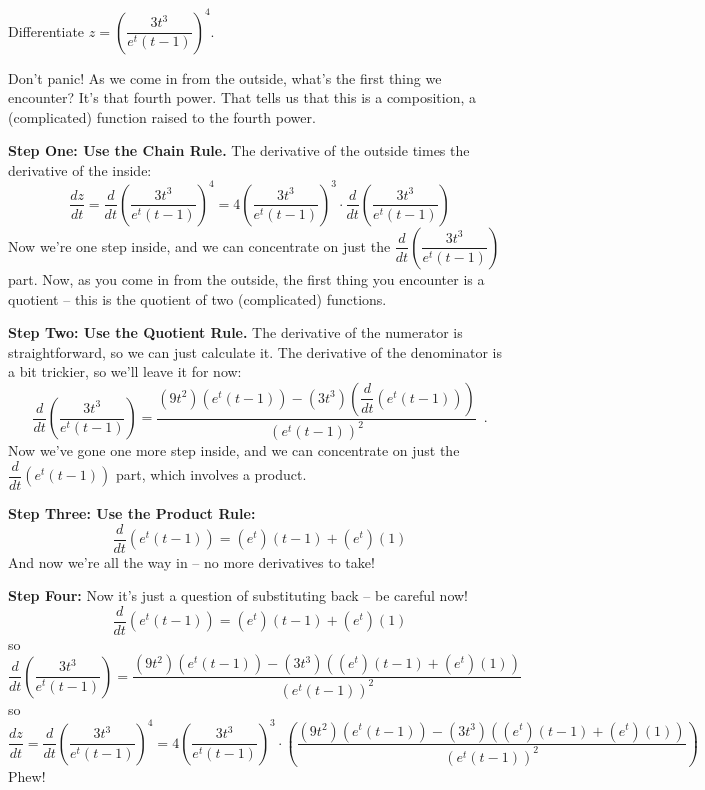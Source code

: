 \begin{example}
Differentiate $ z=\left(\dfrac{3t^3}{e^t(t-1)}\right)^4 $.

\begin{solution} Don't panic! As we come in from the outside, what's the first thing we encounter? It's that fourth power. That tells us that this is a composition, a (complicated) function raised to the fourth power.

{\bf Step One: Use the Chain Rule.} The derivative of the outside times the derivative of the inside:
$$\dfrac{dz}{dt}=\dfrac{d}{dt}\left(\dfrac{3t^3}{e^t(t-1)}\right)^4=4\left(\dfrac{3t^3}{e^t(t-1)}\right)^3\cdot \dfrac{d}{dt}\left(\dfrac{3t^3}{e^t(t-1)}\right)$$
Now we're one step inside, and we can concentrate on just the $ \dfrac{d}{dt}\left(\dfrac{3t^3}{e^t(t-1)}\right) $ part. Now, as you come in from the outside, the first thing you encounter is a quotient -- this is the quotient of two (complicated) functions.

{\bf Step Two: Use the Quotient Rule.} The derivative of the numerator is straightforward, so we can just calculate it. The derivative of the denominator is a bit trickier, so we'll leave it for now:
$$ \dfrac{d}{dt}\left(\dfrac{3t^3}{e^t(t-1)}\right)=\dfrac{\left( 9t^2 \right)\left( e^t(t-1) \right)-\left( 3t^3 \right)\left( \dfrac{d}{dt}\left( e^t(t-1) \right) \right)}{\left(e^t(t-1)\right)^2} \enspace . $$
Now we've gone one more step inside, and we can concentrate on just the $ \dfrac{d}{dt}\left( e^t(t-1) \right) $ part, which involves a product.

{\bf Step Three: Use the Product Rule:}
$$ \dfrac{d}{dt}\left( e^t(t-1)\right) = \left( e^t \right)(t-1)+\left( e^t \right)(1)$$
And now we're all the way in -- no more derivatives to take!

{\bf Step Four:} Now it's just a question of substituting back -- be careful now!
$$ \dfrac{d}{dt}\left( e^t(t-1)\right) = \left( e^t \right)(t-1)+\left( e^t \right)(1) $$ 
so
$$ \dfrac{d}{dt}\left(\dfrac{3t^3}{e^t(t-1)}\right)=\dfrac{\left( 9t^2 \right)\left( e^t(t-1) \right)-\left( 3t^3 \right)\left( \left( e^t \right)(t-1)+\left( e^t \right)(1) \right)}{\left(e^t(t-1)\right)^2} $$ 
so
$$\dfrac{dz}{dt}=\dfrac{d}{dt}\left(\dfrac{3t^3}{e^t(t-1)}\right)^4=4\left(\dfrac{3t^3}{e^t(t-1)}\right)^3\cdot \left( \dfrac{\left( 9t^2 \right)\left( e^t(t-1) \right)-\left( 3t^3 \right)\left( \left( e^t \right)(t-1)+\left( e^t \right)(1) \right)}{\left(e^t(t-1)\right)^2} \right)$$
Phew!
\end{solution}\end{example}


